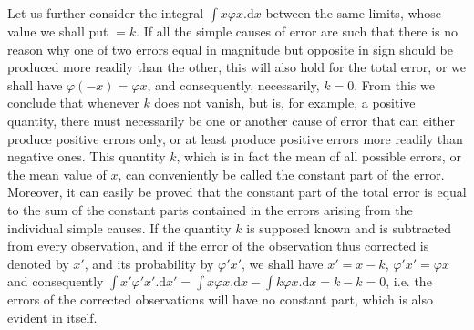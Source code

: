 Let us further consider the integral \(\int x\varphi x.\mathrm{d}x\) between the same limits, whose value we shall put \(=k\). If all the simple causes of error are such that there is no reason why one of two errors equal in magnitude but opposite in sign should be produced more readily than the other, this will also hold for the total error, or we shall have \(\varphi(-x)=\varphi x\), and consequently, necessarily, \(k=0\). From this we conclude that whenever \(k\) does not vanish, but is, for example, a positive quantity, there must necessarily be one or another cause of error that can either produce positive errors only, or at least produce positive errors more readily than negative ones. This quantity \(k\), which is in fact the mean of all possible errors, or the mean value of \(x\), can conveniently be called the constant part of the error. Moreover, it can easily be proved that the constant part of the total error is equal to the sum of the constant parts contained in the errors arising from the individual simple causes. If the quantity \(k\) is supposed known and is subtracted from every observation, and if the error of the observation thus corrected is denoted by \(x'\), and its probability by \(\varphi' x'\), we shall have \(x'=x-k\), \(\varphi' x'=\varphi x\) and consequently \(\int x'\varphi' x'.\mathrm{d}x'=\int x\varphi x.\mathrm{d}x-\int k\varphi x.\mathrm{d}x=k-k=0\), i.e. the errors of the corrected observations will have no constant part, which is also evident in itself.

